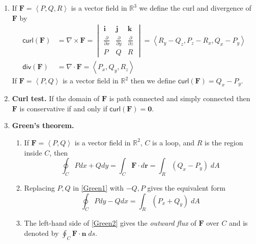 \documentclass[12pt]{article}
\begin{document}
\begin{enumerate}
\item If $\mathbold{F}=\left\langle P,Q,R\right\rangle$
is a vector field in $\mathbb{R}^3$
we define the curl and divergence of $\mathbold{F}$ by
\begin{align*}
\mathsf{curl}\left(\mathbold{F}\right)
&=\nabla\times\mathbold{F}
=\begin{vmatrix}
\mathbold{i}&\mathbold{j}&\mathbold{k}\\
\frac{\partial}{\partial x}&\frac{\partial}{\partial y}
&\frac{\partial}{\partial z}\\P&Q&R 
\end{vmatrix}
=\left\langle R_y-Q_z,P_z-R_x,Q_x-P_y\right\rangle\\
\mathsf{div}\left(\mathbold{F}\right)
&=\nabla\cdot\mathbold{F}=\left\langle P_x,Q_y,R_z\right\rangle
\end{align*}
If $\mathbold{F}=\left\langle P,Q\right\rangle$ 
is a vector field in $\mathbb{R}^2$
then we define
$\mathsf{curl}\left(\mathbold{F}\right)
=Q_x-P_y$.

\item{\bf Curl test.} If the domain of $\mathbold{F}$
is path connected and simply connected then
$\mathbold{F}$ is conservative if and only if $\mathsf{curl}
\left(\mathbold{F}\right)=\mathbold{0}$.

\item{\bf Green's theorem.}
\begin{enumerate}
\item If $\mathbold{F}=\left\langle P,Q\right\rangle$ is a vector
field in $\mathbb{R}^2$, $C$ is a loop,
and $R$ is the region inside $C$, then
\begin{equation}\label{Green1}
\oint_C Pdx+Qdy
=\int_C\mathbold{F}\cdot d\mathbold{r}
=\int_R\left(Q_x-P_y\right)\;dA
\end{equation}
\item Replacing $P,Q$ in \autoref{Green1} with $-Q,P$ gives
the equivalent form
\begin{equation}\label{Green2}
\oint_C Pdy-Qdx
=\int_R\left(P_x+Q_y\right)\;dA
\end{equation}
\item The left-hand side of \autoref{Green2} gives
the {\em outward flux} of $\mathbold{F}$ over $C$
and is denoted by $\oint_C\mathbold{F}\cdot\mathbold{n}\;ds$.
\end{enumerate}


\end{enumerate}
\end{document}
